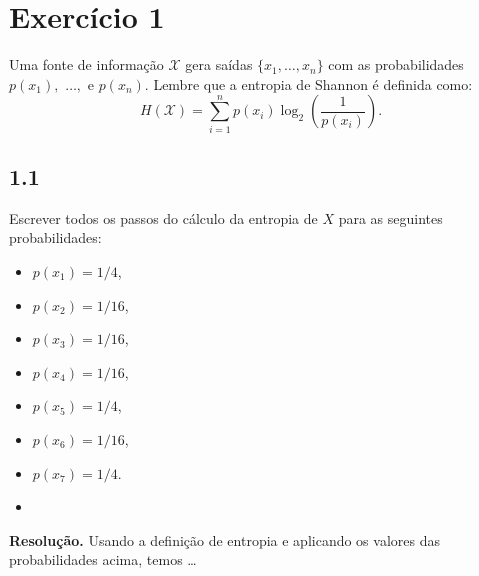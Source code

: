 \documentclass[12pt,letterpaper]{article}
\newcommand\answer{\textbf{Resolução.}\xspace}
\begin{document}
\section*{Exercício 1}

Uma fonte de informação $\mathcal{X}$ gera saídas $\{ x_1, \ldots, x_n\}$
com as probabilidades $p(x_1),$ $\ldots,$ e $p(x_n)$.
Lembre que a entropia de Shannon é definida como:
\[
    H \left( \mathcal{X} \right) = \sum_{i = 1}^{n} p(x_i) \log_2 \left( \frac{1}{p(x_i)} \right).
\]

\subsection*{1.1}
Escrever todos os passos do cálculo da entropia de $X$ para as seguintes probabilidades:
\begin{multicols}{3} %
  \begin{itemize}
    \item $p(x_1) = 1/4$,
    \item $p(x_2) = 1/16$,
    \item $p(x_3) = 1/16$,
    \item $p(x_4) = 1/16$,
    \item $p(x_5) = 1/4$,
    \item $p(x_6) = 1/16$,
    \item $p(x_7) = 1/4$.
    \item[\vspace{\fill}] %
  \end{itemize}
\end{multicols} %


\answer
Usando a definição de entropia e aplicando os valores das probabilidades acima,
temos \ldots
\end{document}
